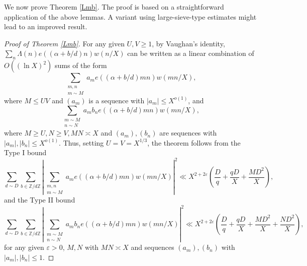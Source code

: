 \documentclass[10pt,a4paper]{amsart}
\newcommand{\1}{
    \bm{1}
}
\newcommand{\aZ}[1]{
\mathbb{Z}/{ #1 \mathbb{Z}}
}
\begin{document}
We now prove Theorem \ref{Lmb}. 
The proof is based on a straightforward application of the above lemmas. 
A variant using large-sieve-type estimates might lead to an improved result. 


\begin{proof}[Proof of Theorem \ref{Lmb}]

For any given $U,V \geq 1$, by Vaughan's identity, $\sum_{n} \Lambda(n) e((\alpha+b/d)n) w(n/X)$ can be written as a linear combination of $O((\ln{X})^2)$ sums of the form
\[ \sum_{\substack{m,n \\ m \sim M}} a_m e((\alpha+b/d)mn) w(mn/X), \]
where $M \leq UV$ and $(a_m)$ is a sequence with $|a_m| \leq X^{o(1)}$, and
\[ \sum_{\substack{m \sim M \\ n \sim N}} a_m b_n e((\alpha+b/d)mn) w(mn/X), \]
where $M \geq U, N \geq V, MN \asymp X$ and $(a_m),(b_n)$ are sequences with $|a_m|,|b_n| \leq X^{o(1)}$. Thus, setting $U=V=X^{1/3}$, the theorem follows from the Type I bound
\begin{equation}
\sum_{d \sim D} \sum_{b \in \aZ{d}} \left| \sum_{\substack{m,n \\ m \sim M}} a_m e((\alpha+b/d)mn) w(mn/X) \right|^2 \ll X^{2+2\varepsilon} \left( \frac{D}{q} + \frac{qD}{X} + \frac{MD^2}{X} \right), \label{exp_I}
\end{equation}
and the Type II bound
\begin{equation}
\sum_{d \sim D} \sum_{b \in \aZ{d}} \left| \sum_{\substack{m \sim M \\ n \sim N}} a_m b_n e((\alpha+b/d)mn) w(mn/X) \right|^2 \ll X^{2+2\varepsilon} \left( \frac{D}{q} + \frac{qD}{X} + \frac{MD^2}{X} + \frac{ND^2}{X} \right), \label{exp_II}
\end{equation}
for any given $\varepsilon>0$, $M,N$ with $MN \asymp X$ and sequences $(a_m),(b_n)$ with $|a_m|,|b_n|\leq 1$. 



\end{proof}
\end{document}
